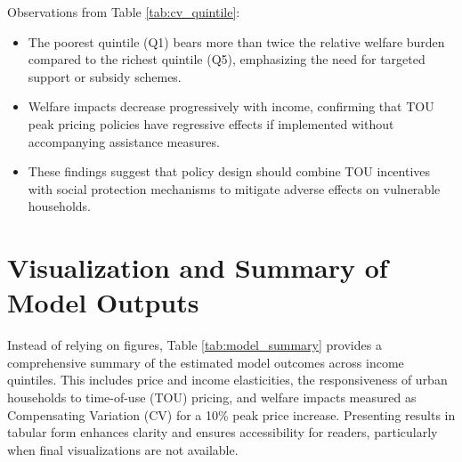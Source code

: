\documentclass[12pt,a4paper]{article}
\begin{document}
	\noindent Observations from Table \ref{tab:cv_quintile}:
	\begin{itemize}
		\item The poorest quintile (Q1) bears more than twice the relative welfare burden compared to the richest quintile (Q5), emphasizing the need for targeted support or subsidy schemes.
		\item Welfare impacts decrease progressively with income, confirming that TOU peak pricing policies have regressive effects if implemented without accompanying assistance measures.
		\item These findings suggest that policy design should combine TOU incentives with social protection mechanisms to mitigate adverse effects on vulnerable households.
	\end{itemize}
		
	\section{Visualization and Summary of Model Outputs}
	
	Instead of relying on figures, Table \ref{tab:model_summary} provides a comprehensive summary of the estimated model outcomes across income quintiles. This includes price and income elasticities, the responsiveness of urban households to time-of-use (TOU) pricing, and welfare impacts measured as Compensating Variation (CV) for a 10\% peak price increase. Presenting results in tabular form enhances clarity and ensures accessibility for readers, particularly when final visualizations are not available.
	
\end{document}
